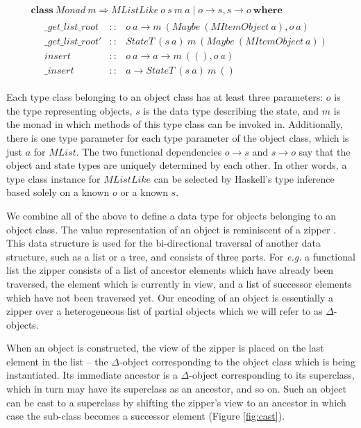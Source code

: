 \documentclass[runningheads,a4paper]{llncs}
\begin{document}
\begin{displaymath}
\begin{array}{l}
\mathbf{class}~\mathit{Monad}~m \Rightarrow \mathit{MListLike}~o~s~m~a \mid o \to s, s \to o~\mathbf{where} \\
\quad \begin{array}{lcl}
\_\mathit{get}\_\mathit{list}\_\mathit{root} & :: & o~a \to m~(\mathit{Maybe}~(\mathit{MItemObject~a}), o~a)\\
\_\mathit{get}\_\mathit{list}\_\mathit{root}' & :: & \mathit{StateT}~(s~a)~m~(\mathit{Maybe}~(\mathit{MItemObject}~a))\\
\mathit{insert} & :: & o~a \to a \to m~((),o~a) \\
\_\mathit{insert} & :: & a \to \mathit{StateT}~(s~a)~m~()
\end{array}
\end{array}
\end{displaymath}

Each type class belonging to an object class has at least three parameters: $o$ is the type representing objects, $s$ is the data type describing the state, and $m$ is the monad in which methods of this type class can be invoked in. Additionally, there is one type parameter for each type parameter of the object class, which is just $a$ for $\mathit{MList}$. The two functional dependencies $o \to s$ and $s \to o$ say that the object and state types are uniquely determined by each other. In other words, a type class instance for $\mathit{MListLike}$ can be selected by Haskell's type inference based solely on a known $o$ or a known $s$.

We combine all of the above to define a data type for objects belonging to an object class. The value representation of an object is reminiscent of a zipper \cite{huet1997zipper}. This data structure is used for the bi-directional traversal of another data structure, such as a list or a tree, and consists of three parts. For \emph{e.g.} a functional list the zipper consists of a list of ancestor elements which have already been traversed, the element which is currently in view, and a list of successor elements which have not been traversed yet. Our encoding of an object is essentially a zipper over a heterogeneous list of partial objects which we will refer to as $\Delta$-objects. 

When an object is constructed, the view of the zipper is placed on the last element in the list -- the $\Delta$-object corresponding to the object class which is being instantiated. Its immediate ancestor is a $\Delta$-object corresponding to its superclass, which in turn may have its superclass as an ancestor, and so on. Such an object can be cast to a superclass by shifting the zipper's view to an ancestor in which case the sub-class becomes a successor element (Figure \ref{fig:cast}).
\end{document}
